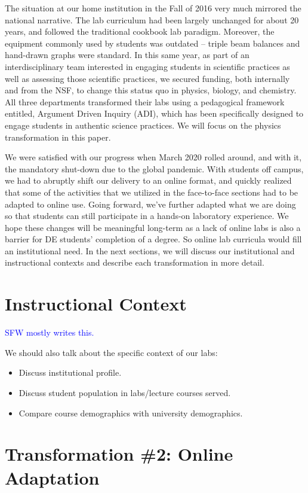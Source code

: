 \documentclass[aip, numerical, preprint]{revtex4-2}
\begin{document}
The situation at our home institution in the Fall of 2016 very much mirrored the national
narrative.  The lab curriculum had been largely unchanged for about 20 years, and followed the
traditional cookbook lab paradigm.  Moreover, the equipment commonly used by students was
outdated -- triple beam balances and hand-drawn graphs were standard.  In this same year, as
part of an interdisciplinary team interested in engaging students in scientific practices as
well as assessing those scientific practices, we secured funding, both internally and from the
NSF, to change this status quo in physics, biology, and chemistry.  All three departments
transformed their labs using a pedagogical framework entitled, Argument Driven Inquiry
(ADI),\cite{Sampson2011,Walker2011,Walker2016} which has been specifically designed to engage
students in authentic science practices. We will focus on the physics transformation in this
paper.

We were satisfied with our progress when March 2020 rolled around, and with it, the mandatory
shut-down due to the global pandemic.  With students off campus, we had to abruptly shift our
delivery to an online format, and quickly realized that some of the activities that we utilized
in the face-to-face sections had to be adapted to online use.  Going forward, we've further
adapted what we are doing so that students can still participate in a hands-on laboratory
experience.  We hope these changes will be meaningful long-term as a lack of online labs is
also a barrier for DE students' completion of a degree.  So online lab curricula would fill an
institutional need.  In the next sections, we will discuss our institutional and instructional
contexts and describe each transformation in more detail.

\section{Instructional Context}
\textcolor{blue}{SFW mostly writes this.}

We should also talk about the specific context of our labs:
\begin{itemize}
  \item Discuss institutional profile.
  \item Discuss student population in labs/lecture courses served.
  \item Compare course demographics with university demographics.
\end{itemize}

\section{Transformation \#2: Online Adaptation}
\end{document}
